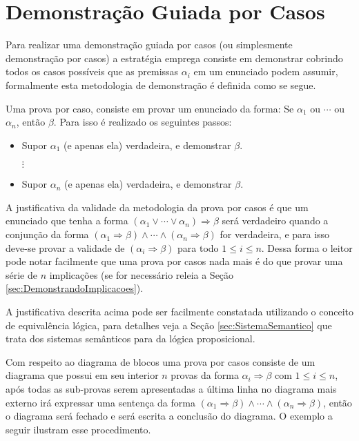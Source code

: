 \section{Demonstração Guiada por Casos}

Para realizar uma demonstração guiada por casos (ou simplesmente demonstração por casos) a estratégia emprega consiste em demonstrar cobrindo todos os casos possíveis que as premissas  $\alpha_i$ em um enunciado podem assumir, formalmente esta metodologia de demonstração é definida como se segue.

\begin{definition}\label{metodo:PorCasos}
	Uma prova por caso, consiste em provar um enunciado da forma: Se $\alpha_1$ ou $\cdots$ ou $\alpha_n$, então $\beta$. Para isso é realizado os seguintes passos:
	\begin{itemize}
		\item Supor $\alpha_1$ (e apenas ela) verdadeira, e demonstrar $\beta$.
		
		$\vdots$
		
		\item Supor $\alpha_n$ (e apenas ela) verdadeira, e demonstrar $\beta$.
	\end{itemize}
\end{definition}

A justificativa da validade  da metodologia da prova por casos é que um enunciado que tenha a forma $(\alpha_1 \lor \cdots \lor \alpha_n) \Rightarrow \beta$ será verdadeiro quando a conjunção da forma $(\alpha_1 \Rightarrow \beta) \land \cdots \land (\alpha_n \Rightarrow \beta)$ for verdadeira,  e para isso deve-se provar a validade de $(\alpha_i \Rightarrow \beta)$ para todo $1 \leq i \leq n$. Dessa forma o leitor pode notar facilmente que uma prova por casos nada mais é do que provar uma série de $n$ implicações (se for necessário releia a Seção \ref{sec:DemonstrandoImplicacoes}).

\begin{remark}
	A justificativa descrita acima pode ser facilmente constatada utilizando o conceito de equivalência lógica, para detalhes veja a Seção \ref{sec:SistemaSemantico} que trata dos sistemas semânticos para da lógica proposicional.
\end{remark}
	
Com respeito ao diagrama de blocos uma prova por casos consiste de um diagrama que possui em seu interior $n$ provas da forma $\alpha_i \Rightarrow \beta$ com $1 \leq i \leq n$, após todas as sub-provas serem apresentadas a última linha no diagrama mais externo irá expressar uma sentença da forma $(\alpha_1 \Rightarrow \beta) \land \cdots \land (\alpha_n \Rightarrow \beta)$, então o diagrama será fechado e será escrita a conclusão do diagrama. O exemplo a seguir ilustram esse procedimento.
	
